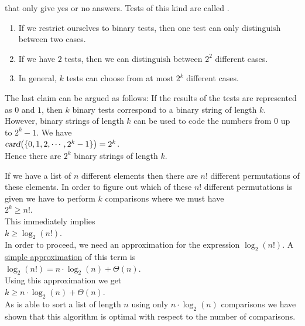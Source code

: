 that only give yes or no answers.  Tests of this kind are called .
\begin{enumerate}
\item If we restrict ourselves to binary tests, then one test can only distinguish between two cases.
\item If we have $2$ tests, then we can distinguish between  $2^2$ different cases.
\item In general, $k$ tests can choose from at most $2^k$ different cases.
\end{enumerate}
The last claim can be argued as follows:  If the results of the tests are represented as
$0$ and $1$, then $k$ binary tests correspond to a binary string of length
$k$.  However, binary strings of length $k$ can be used to code the numbers from $0$ up to
$2^{k}-1$.  We have
\\[0.2cm]
\hspace*{1.3cm}
$\textsl{card}\bigl(\{0,1,2,\cdots, 2^k-1\}\bigr) = 2^k$.
\\[0.2cm]
Hence there are $2^k$ binary strings of length $k$.  

If we have a list of $n$ different elements then there are $n!$ different permutations of these
elements.  In order to figure out which of these $n!$ different permutations is given we have to
perform $k$ comparisons where we must have
\\[0.2cm]
\hspace*{1.3cm}
$2^k \geq n!$.
\\[0.2cm]
This immediately implies
\\[0.2cm]
\hspace*{1.3cm}
$k \geq \log_2(n!)$.
\\[0.2cm]
In order to proceed, we need an approximation for the expression $\log_2(n!)$.  
A \href{http://en.wikipedia.org/wiki/Stirling's_approximation}{simple approximation} of this term is
\\[0.2cm]
\hspace*{1.3cm}
$\log_2(n!) = n \cdot \log_2(n) + \Theta(n)$.
\\[0.2cm]
Using this approximation we get
\\[0.2cm]
\hspace*{1.3cm}
$k \geq n \cdot \log_2(n) + \Theta(n)$.
\\[0.2cm]
As  is able to sort a list of length $n$ using only $n \cdot \log_2(n)$ comparisons
we have shown that this algorithm is optimal with respect to the number of comparisons.


